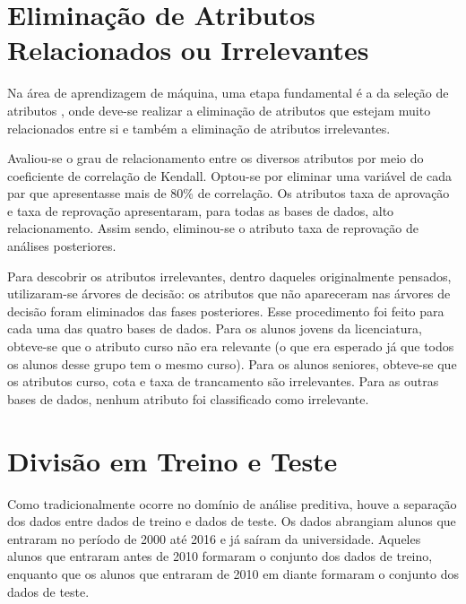 \section{Eliminação de Atributos Relacionados ou Irrelevantes}
\par Na área de aprendizagem de máquina, uma etapa fundamental é a da seleção de
atributos \cite{useful_ml}, onde deve-se realizar a
eliminação de atributos que estejam muito relacionados entre si e também a eliminação
de atributos irrelevantes. 
 
\par Avaliou-se o grau de relacionamento entre os diversos atributos por meio do
coeficiente de correlação de Kendall. Optou-se por eliminar uma variável de cada par
que apresentasse mais de 80\% de correlação. Os atributos taxa de aprovação e taxa de
reprovação apresentaram, para todas as bases de dados, alto relacionamento. Assim
sendo, eliminou-se o atributo taxa de reprovação de análises posteriores. 

\par Para descobrir os atributos irrelevantes, dentro daqueles originalmente
pensados, utilizaram-se árvores de decisão: os atributos que não apareceram nas
árvores de decisão foram eliminados das fases posteriores. Esse procedimento foi
feito para cada uma das quatro bases de dados. Para os alunos jovens da licenciatura,
obteve-se que o atributo curso não era relevante (o que era esperado já que todos os alunos
desse grupo tem o mesmo curso). Para os alunos seniores, obteve-se que os atributos
curso, cota e taxa de trancamento são irrelevantes. Para as outras bases de dados, nenhum
atributo foi classificado como irrelevante. 

\section{Divisão em Treino e Teste}
Como tradicionalmente ocorre no domínio de análise preditiva, houve a separação dos
dados entre dados de treino e dados de teste. Os dados abrangiam alunos que entraram
no período de 2000 até 2016 e já saíram da universidade. Aqueles alunos que entraram
antes de 2010 formaram o conjunto dos dados de treino, enquanto que os alunos que
entraram de 2010 em diante formaram o conjunto dos dados de teste. 


